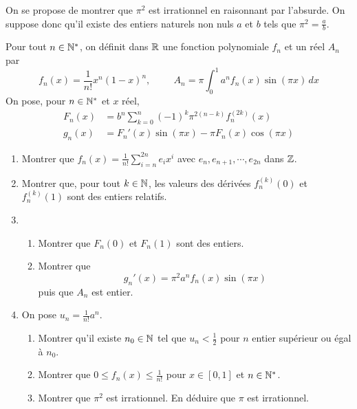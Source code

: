 On se propose de montrer que $\pi^2$ est irrationnel en raisonnant par l'absurde. On suppose donc qu'il existe des entiers naturels non nuls $a$ et $b$ tels que $\pi^2=\frac{a}{b}$.

Pour tout $n\in \mathbb{N}^*$, on définit dans $\mathbb{R}$ une fonction polynomiale $f_n$ et un réel $A_n$ par
\begin{displaymath}
 f_n(x)=\frac{1}{n!}x^n(1-x)^n,\hspace{1cm}
A_n = \pi \int_{0}^{1}a^nf_n(x)\sin(\pi x)\,dx
\end{displaymath}
On pose, pour $n\in\mathbb{N}^*$ et $x$ réel,
\begin{align*}
 F_n(x)&=b^n\sum_{k=0}^{n}(-1)^k\pi^{2(n-k)}f_n^{(2k)}(x) \\
 g_n(x)&=F_n'(x)\sin(\pi x)-\pi F_n(x)\cos(\pi x)
\end{align*}


\begin{enumerate}
 \item Montrer que $f_n(x)=\frac{1}{n!}\sum_{i=n}^{2n}e_i x^i$ avec $e_n,e_{n+1},\cdots,e_{2n}$ dans $\mathbb{Z}$.
 \item Montrer que, pour tout $k\in\mathbb{N}$, les valeurs des dérivées $f_n^{(k)}(0)$ et $f_n^{(k)}(1)$ sont des entiers relatifs.
\item
\begin{enumerate}
 \item Montrer que $F_n(0)$ et $F_n(1)$ sont des entiers.
 \item Montrer que
\begin{displaymath}
 g_n'(x)=\pi^2a^nf_n(x)\sin(\pi x)
\end{displaymath}
 puis que $A_n$ est entier.
\end{enumerate}

\item On pose $u_n=\frac{1}{n!}a^n$.
\begin{enumerate}
 \item Montrer qu'il existe $n_0\in \mathbb{N}$ tel que $u_n< \frac{1}{2}$ pour $n$ entier supérieur ou égal à $n_0$.
 \item Montrer que $0\leq f_n(x)\leq \frac{1}{n!}$ pour $x\in[0,1]$ et $n\in \mathbb{N}^*$.
 \item Montrer que $\pi^2$ est irrationnel. En déduire que $\pi$ est irrationnel.
\end{enumerate}

\end{enumerate}
